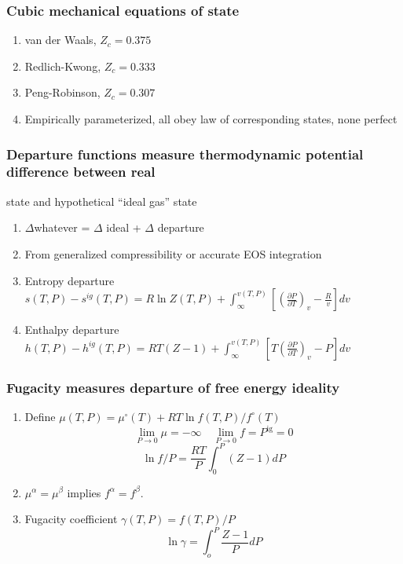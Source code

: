 \documentclass[11pt]{article}
\begin{document}
\subsubsection{Cubic mechanical equations of state}
\label{sec:org1d8156d}
\begin{enumerate}
\item van der Waals, \(Z_c = 0.375\)
\item Redlich-Kwong,  \(Z_c = 0.333\)
\item Peng-Robinson, \(Z_c = 0.307\)
\item Empirically parameterized, all obey law of corresponding states, none perfect
\end{enumerate}
\subsubsection{Departure functions measure thermodynamic potential difference between real}
\label{sec:orgf4d3ef9}
state and hypothetical ``ideal gas'' state
\begin{enumerate}
\item \(\Delta\)whatever = \(\Delta\) ideal + \(\Delta\) departure
\item From generalized compressibility or accurate EOS integration
\item Entropy departure \(s(T,P) - s^{ig}(T,P) = R \ln Z(T,P) + \int_\infty^{v(T,P)} \left [ \left ( \frac{\partial P}{\partial T}\right )_v - \frac{R}{v} \right ] dv\)
\item Enthalpy departure \(h(T,P) - h^{ig}(T,P) = RT \left ( Z-1 \right )  + \int_\infty^{v(T,P)} \left [ T \left  ( \frac{\partial P}{\partial T}\right )_v - P \right ] dv\)
\end{enumerate}
\subsubsection{Fugacity measures departure of free energy ideality}
\label{sec:orgb775f03}
\begin{enumerate}
\item Define \(\mu(T,P) = \mu^\circ(T) + RT \ln f(T,P)/f^\circ(T)\)
\begin{equation*}
  \lim_{P\rightarrow 0} \mu = -\infty\quad \lim_{P\rightarrow 0} f =P^\text{ig} =0
\end{equation*}
\begin{equation*}
  \ln f/P = \dfrac{RT}{P}\int_0^P(Z-1)dP
\end{equation*}
\item \(\mu^\alpha = \mu^\beta\) implies \(f^\alpha = f^\beta\).
\item Fugacity coefficient \(\gamma(T,P) = f(T,P)/P\)
\begin{equation*}
  \ln\gamma=\int_o^P\dfrac{Z-1}{P}dP
\end{equation*}
\end{enumerate}
\end{document}
